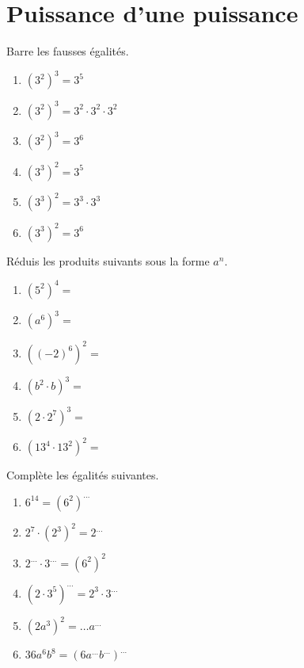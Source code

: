 \documentclass[../math2.tex]{subfiles}
\begin{document}
\pagebreak
\section{Puissance d'une puissance}
Barre les fausses égalités.
\begin{enumerate} [cols=3, itemsep=0.8cm, label=] 
	\item $(3^2)^3=3^5$
	\item $(3^2)^3=3^2\cdot 3^2\cdot 3^2$
	\item $ (3^2)^3=3^6$
	\item $(3^3)^2=3^5$
	\item $(3^3)^2=3^3\cdot3^3$
	\item $(3^3)^2=3^6$
\end{enumerate}


\begin{center}
\end{center}

\begin{exercise}
	Réduis les produits suivants sous la forme $a^n$.
	\begin{enumerate} [cols=3]
		\item $(5^2)^4=$
		\item $(a^6)^3=$
		\item $\left((-2)^6\right)^2=$
		\item $\left(b^2\cdot b\right)^3=$
		\item $\left(2\cdot 2^7\right)^3=$
		\item $\left(13^4\cdot13^2\right)^2=$
	\end{enumerate}
\end{exercise}

\begin{exercise}
	Complète les égalités suivantes.
	\begin{enumerate} [cols=2]
		\item $6^{14}=(6^2)^{\dots}$
		\item $2^7\cdot(2^3)^2=2^{\dots}$
		\item $2^{\dots}\cdot 3^{\dots}=(6^2)^2$
		\item $\left(2\cdot 3^5\right)^{\dots}=2^3\cdot 3^{\dots}$
		\item $\left(2a^3\right)^2=\dots a^{\dots}$
		\item $36a^6b^8=\left(6a^{\dots}b^{\dots}\right)^{\dots}$
	\end{enumerate}
\end{exercise}
\end{document}
